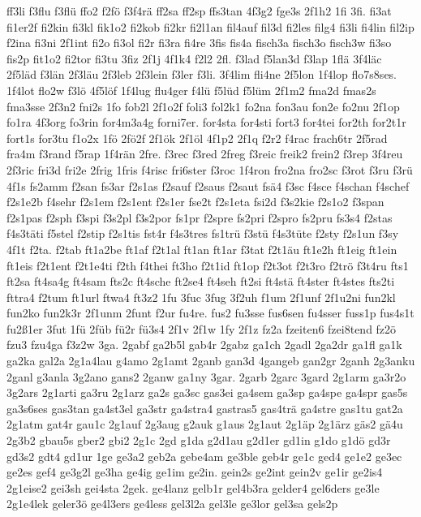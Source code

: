 {ff3li
f3flu
f3flü
ffo2
f2fö
f3f4rä
ff2sa
ff2sp
ffs3tan
4f3g2
fge3s
2f1h2
1fi
3fi.
fi3at
fi1er2f
fi2kin
fi3kl
fik1o2
fi2kob
fi2kr
fi2l1an
fil4auf
fil3d
fi2les
filg4
fi3li
fi4lin
fil2ip
f2ina
fi3ni
2f1int
fi2o
fi3ol
fi2r
fi3ra
fi4re
3fis
fis4a
fisch3a
fisch3o
fisch3w
fi3so
fis2p
fit1o2
fi2tor
fi3tu
3fiz
2f1j
4f1k4
f2l2
2fl.
f3lad
f5lan3d
f3lap
1flä
3f4läc
2f5läd
f3län
2f3läu
2f3leb
2f3lein
f3ler
f3li.
3f4lim
fli4ne
2f5lon
1f4lop
flo7s8ses.
1f4lot
flo2w
f3lö
4f5löf
1f4lug
flu4ger
f4lü
f5lüd
f5lüm
2f1m2
fma2d
fmas2s
fma3sse
2f3n2
fni2s
1fo
fob2l
2f1o2f
foli3
fol2k1
fo2na
fon3au
fon2e
fo2nu
2f1op
fo1ra
4f3org
fo3rin
for4m3a4g
forni7er.
for4sta
for4sti
fort3
for4tei
for2th
for2t1r
fort1s
for3tu
f1o2x
1fö
2fö2f
2f1ök
2f1öl
4f1p2
2f1q
f2r2
f4rac
frach6tr
2f5rad
fra4m
f3rand
f5rap
1f4rän
2fre.
f3rec
f3red
2freg
f3reic
freik2
frein2
f3rep
3f4reu
2f3ric
fri3d
fri2e
2frig
1fris
f4risc
fri6ster
f3roc
1f4ron
fro2na
fro2sc
f3rot
f3ru
f3rü
4f1s
fs2amm
f2san
fs3ar
f2s1as
f2sauf
f2saus
f2saut
fsä4
f3sc
f4sce
f4schan
f4schef
f2s1e2b
f4sehr
f2s1em
f2s1ent
f2s1er
fse2t
f2s1eta
fsi2d
f3s2kie
f2s1o2
f3span
f2s1pas
f2sph
f3spi
f3s2pl
f3s2por
fs1pr
f2spre
fs2pri
f2spro
fs2pru
fs3s4
f2stas
f4s3täti
f5stel
f2stip
f2s1tis
fst4r
f4s3tres
fs1trü
f3stü
f4s3tüte
f2sty
f2s1un
f3sy
4f1t
f2ta.
f2tab
ft1a2be
ft1af
f2t1al
ft1an
ft1ar
f3tat
f2t1äu
ft1e2h
ft1eig
ft1ein
ft1eis
f2t1ent
f2t1e4ti
f2th
f4thei
ft3ho
f2t1id
ft1op
f2t3ot
f2t3ro
f2trö
f3t4ru
fts1
ft2sa
ft4sa4g
ft4sam
fts2c
ft4sche
ft2se4
ft4seh
ft2si
ft4stä
ft4ster
ft4stes
fts2ti
fttra4
f2tum
ft1url
ftwa4
ft3z2
1fu
3fuc
3fug
3f2uh
f1um
2f1unf
2f1u2ni
fun2kl
fun2ko
fun2k3r
2f1unm
2funt
f2ur
fu4re.
fus2
fu3sse
fus6sen
fu4sser
fuss1p
fus4s1t
fu2ß1er
3fut
1fü
2füb
fü2r
fü3s4
2f1v
2f1w
1fy
2f1z
fz2a
fzeiten6
fzei8tend
fz2ö
fzu3
fzu4ga
f3z2w
3ga.
2gabf
ga2b5l
gab4r
2gabz
ga1ch
2gadl
2ga2dr
ga1fl
ga1k
ga2ka
gal2a
2g1a4lau
g4amo
2g1amt
2ganb
gan3d
4gangeb
gan2gr
2ganh
2g3anku
2ganl
g3anla
3g2ano
gans2
2ganw
ga1ny
3gar.
2garb
2garc
3gard
2g1arm
ga3r2o
3g2ars
2g1arti
ga3ru
2g1arz
ga2s
ga3sc
gas3ei
ga4sem
ga3sp
ga4spe
ga4spr
gas5s
ga3s6ses
gas3tan
ga4st3el
ga3str
ga4stra4
gastras5
gas4trä
ga4stre
gas1tu
gat2a
2g1atm
gat4r
gau1c
2g1auf
2g3aug
g2auk
g1aus
2g1aut
2g1äp
2g1ärz
gäs2
gä4u
2g3b2
gbau5s
gber2
gbi2
2g1c
2gd
g1da
g2d1au
g2d1er
gd1in
g1do
g1dö
gd3r
gd3s2
gdt4
gd1ur
1ge
ge3a2
geb2a
gebe4am
ge3ble
geb4r
ge1c
ged4
ge1e2
ge3ec
ge2es
gef4
ge3g2l
ge3ha
ge4ig
ge1im
ge2in.
gein2s
ge2int
gein2v
ge1ir
ge2is4
2g1eise2
gei3sh
gei4sta
2gek.
ge4lanz
gelb1r
gel4b3ra
gelder4
gel6ders
ge3le
2g1e4lek
geler3ö
ge4l3ers
ge4less
gel3l2a
gel3le
ge3lor
gel3sa
gels2p
}
